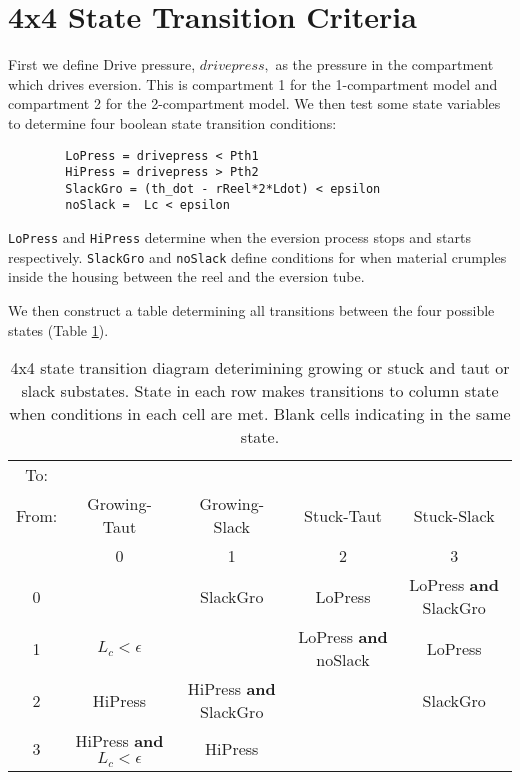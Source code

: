 \documentclass[letterpaper]{article}
\begin{document}
\setpagewiselinenumbers        %
\modulolinenumbers[1]          %



\date{\today}

\section*{4x4 State Transition Criteria}
First we define Drive pressure, $drivepress,$
as the pressure in the compartment which drives eversion.
This is compartment 1 for the 1-compartment model and compartment 2 for the 2-compartment
model.  We then test some state variables to determine four boolean
state transition  conditions:
\begin{verbatim}
        LoPress = drivepress < Pth1
        HiPress = drivepress > Pth2
        SlackGro = (th_dot - rReel*2*Ldot) < epsilon
        noSlack =  Lc < epsilon
\end{verbatim}

\texttt{LoPress} and \texttt{HiPress} determine when the eversion process stops and starts
respectively. \texttt{SlackGro} and \texttt{noSlack} define conditions for when
material crumples inside the housing between the reel and the eversion tube.

We then construct a table determining all transitions between the four possible states
(Table \ref{4x4stateTable}).


\begin{table}[h]
\begin{tabular}{c|c|c|c|c}
 To: \\From: &  Growing-Taut   & Growing-Slack   & Stuck-Taut  & Stuck-Slack \\ \hline
             &     0  & 1 & 2 & 3 \\ \hline
0    &  & SlackGro & LoPress  & LoPress {\bf and} SlackGro \\ \hline
1    & $L_c < \epsilon$  &   & LoPress \textbf{and} noSlack  &  LoPress \\ \hline
2    & HiPress    & HiPress \textbf{and} SlackGro &   &  SlackGro \\ \hline
3    & HiPress \textbf{and} $L_c<\epsilon$ & HiPress &   & \\
\end{tabular}\caption{4x4 state transition diagram deterimining growing or stuck and
taut or slack substates.  State in each row makes transitions to
column state when conditions
in each cell are met. Blank cells indicating in the same state.}\label{4x4stateTable}
\end{table}
\end{document}
